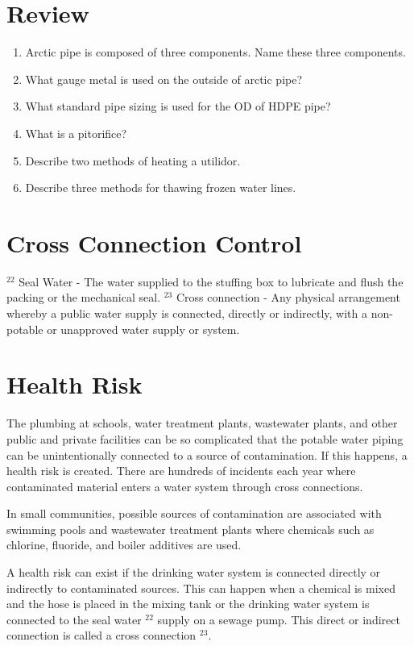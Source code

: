 \documentclass[10pt]{article}
\begin{document}
\section{Review}
\begin{enumerate}
  \item Arctic pipe is composed of three components. Name these three components.

  \item What gauge metal is used on the outside of arctic pipe?

  \item What standard pipe sizing is used for the OD of HDPE pipe?

  \item What is a pitorifice?

  \item Describe two methods of heating a utilidor.

  \item Describe three methods for thawing frozen water lines.

\end{enumerate}
\section{Cross Connection Control}
${ }^{22}$ Seal Water - The water supplied to the stuffing box to lubricate and flush the packing or the mechanical seal. ${ }^{23}$ Cross connection - Any physical arrangement whereby a public water supply is connected, directly or indirectly, with a non-potable or unapproved water supply or system.

\section{Health Risk}
The plumbing at schools, water treatment plants, wastewater plants, and other public and private facilities can be so complicated that the potable water piping can be unintentionally connected to a source of contamination. If this happens, a health risk is created. There are hundreds of incidents each year where contaminated material enters a water system through cross connections.

In small communities, possible sources of contamination are associated with swimming pools and wastewater treatment plants where chemicals such as chlorine, fluoride, and boiler additives are used.

A health risk can exist if the drinking water system is connected directly or indirectly to contaminated sources. This can happen when a chemical is mixed and the hose is placed in the mixing tank or the drinking water system is connected to the seal water $^{22}$ supply on a sewage pump. This direct or indirect connection is called a cross connection ${ }^{23}$.
\end{document}

